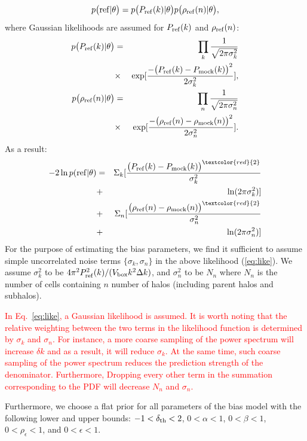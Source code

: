 \documentclass[english,usenatbib]{mn2e}
\newcommand{\tod}[1]{{\textcolor{red}{ #1}}}
\newcommand{\be}{\begin{equation}}
\newcommand{\ee}{\end{equation}}
\newcommand{\ba}{\begin{eqnarray}}
\newcommand{\ea}{\end{eqnarray}}
\begin{document}
\be
p\big(\mathrm{ref}|\theta \big) = p\big(P_{\rm ref}(k)|\theta \big ) p\big(\rho_{\rm ref}(n)|\theta \big),
\label{eq:probs}
\ee
where Gaussian likelihoods are assumed for $P_{\rm ref}(k)$ and $\rho_{\rm ref}(n)$:
\ba
p\big(P_{\rm ref}(k)|\theta \big ) &=& \prod_{k} \frac{1}{\sqrt{2\pi\sigma_k^2}} \\ 
&\times& \exp[\frac{-\big(P_{\rm ref}(k)-P_{\rm mock}(k)\big)^2}{2\sigma_k^{2}}],\\
p\big(\rho_{\rm ref}(n)|\theta \big ) &=& \prod_{n} \frac{1}{\sqrt{2\pi\sigma_n^2}} \\ 
&\times& \exp[\frac{-\big(\rho_{\rm ref}(n)-\rho_{\rm mock}(n)\big)^2}{2\sigma_n^{2}}].
\ea
As a result:
\ba
-2\ln p(\mathrm{ref}|\theta) &=& \Sigma_{k}[\frac{\big(P_{\rm ref}(k)-P_{\rm mock}(k)\big)^{\tod{2}}}{\sigma^{2}_{k}}  \nonumber \\
&+& \ln(2\pi\sigma_k^2)] \nonumber \\
&+& \Sigma_{n}[\frac{\big(\rho_{\rm ref}(n)-\rho_{\rm mock}(n)\big)^{\tod{2}}}{\sigma^{2}_{n}} \\
&+& \ln(2\pi\sigma_n^2)] \nonumber \\
\label{eq:like}
\ea
For the purpose of estimating the bias parameters, we find it sufficient to assume simple uncorrelated noise terms $\{\sigma_{k},\sigma_{n}\}$ in the above likelihood (\ref{eq:like}). We assume $\sigma_{k}^{2}$ to be $4\pi^{2} P_{\rm ref}^{2}(k)/(V_{\rm box}k^{2}\Delta k)$, and $\sigma_n^{2}$ to be $N_n$ where $N_n$ is the number of cells containing $n$ number of halos (including parent halos and subhalos).

\tod{In Eq.~\ref{eq:like}, a Gaussian likelihood is assumed. It is worth noting that the relative weighting between the two terms in the likelihood function is determined by $\sigma_k$ and $\sigma_n$. For instance, a more coarse sampling of the power spectrum will increase $\delta k$ and as a result, it will reduce $\sigma_k$. At the same time, such coarse sampling of the power spectrum reduces the prediction strength of the denominator. Furthermore, Dropping every other term in the summation corresponding to the PDF will decrease $N_n$ and $\sigma_n.$} 

Furthermore, we choose a flat prior for all parameters of the bias model with the following lower and upper bounds: $-1<\delta_{\rm th}<2$, $0<\alpha<1$, $0<\beta<1$, $0<\rho_{\epsilon}<1$, and $0<\epsilon<1$.
\end{document}
